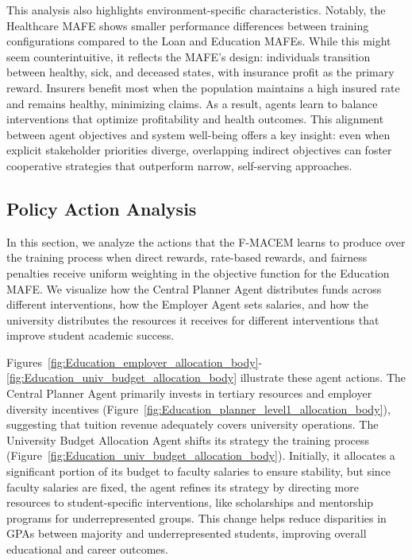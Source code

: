 This analysis also highlights environment-specific characteristics. Notably, the Healthcare MAFE shows smaller performance differences between training configurations compared to the Loan and Education MAFEs. While this might seem counterintuitive, it reflects the MAFE's design: individuals transition between healthy, sick, and deceased states, with insurance profit as the primary reward. Insurers benefit most when the population maintains a high insured rate and remains healthy, minimizing claims. As a result, agents learn to balance interventions that optimize profitability and health outcomes. This alignment between agent objectives and system well-being offers a key insight: even when explicit stakeholder priorities diverge, overlapping indirect objectives can foster cooperative strategies that outperform narrow, self-serving approaches.

\vspace{-2mm}
\subsection{Policy Action Analysis}
\label{exp::action_analysis}

In this section, we analyze the actions that the F-MACEM learns to produce over the training process when direct rewards, rate-based rewards, and fairness penalties receive uniform weighting in the objective function for the Education MAFE. We visualize how the Central Planner Agent distributes funds across different interventions, how the Employer Agent sets salaries, and how the university distributes the resources it receives for different interventions that improve student academic success.

Figures~\ref{fig:Education_employer_allocation_body}-\ref{fig:Education_univ_budget_allocation_body} illustrate these agent actions. The Central Planner Agent primarily invests in tertiary resources and employer diversity incentives (Figure~\ref{fig:Education_planner_level1_allocation_body}), suggesting that tuition revenue adequately covers university operations. The University Budget Allocation Agent shifts its strategy the training process (Figure~\ref{fig:Education_univ_budget_allocation_body}). Initially, it allocates a significant portion of its budget to faculty salaries to ensure stability, but since faculty salaries are fixed, the agent refines its strategy by directing more resources to student-specific interventions, like scholarships and mentorship programs for underrepresented groups. This change helps reduce disparities in GPAs between majority and underrepresented students, improving overall educational and career outcomes.

